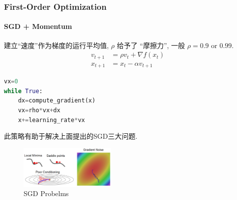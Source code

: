 \subsubsection{First-Order Optimization}
\paragraph{SGD + Momentum}
建立``速度''作为梯度的运行平均值, $\rho$ 给予了 ``摩擦力'', 一般 $\rho=0.9 \text{ or } 0.99$. 
\begin{align*}
    v_{t+1}&=\rho v_t+\nabla f(x_t)\\
    x_{t+1}&=x_t-\alpha v_{t+1}
\end{align*}

\begin{lstlisting}[language={python}]
vx=0
while True:
    dx=compute_gradient(x)
    vx=rho*vx+dx
    x+=learning_rate*vx
\end{lstlisting}

此策略有助于解决上面提出的SGD三大问题.

\begin{figure}[!htb]
    \centering
    \includegraphics[width=0.42\textwidth]{pic/Lec7/SGDP.png}
    \caption{SGD Probelms}
\end{figure}

